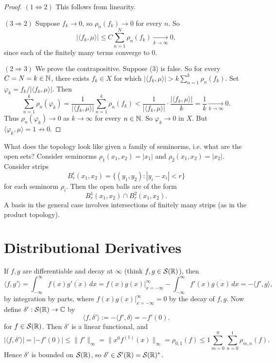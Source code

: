 \begin{proof}
  $(1 \Leftrightarrow 2)$
  This follows from linearity.

  $(3 \Rightarrow 2)$ Suppose
  $f_k \to 0$, so
  $\rho_n(f_k) \to 0$ for every $n$. So
  \[
    |\langle f_k, \mu \rangle|
    \le C \sum_{n = 1}^N \rho_n(f_k)
    \xrightarrow[k \to \infty]{} 0,
  \]
  since
  each of the finitely many terms
  converge to $0$.

  $(2 \Rightarrow 3)$ We prove the
  contrapositive. Suppose (3) is
  false. So for every $C = N = k \in \mathbb{N}$,
  there exists $f_k \in X$ for which
  $|\langle f_k, \mu \rangle| > k \sum_{n = 1}^k \rho_n(f_k)$.
  Set $\varphi_k = f_k / |\langle f_k, \mu \rangle|$.
  Then
  \[
    \sum_{n = 1}^k \rho_n(\varphi_k)
    = \frac{1}{|\langle f_k, \mu \rangle|}
    \sum_{n = 1}^k \rho_n(f_k)
    < \frac{1}{|\langle f_k, \mu \rangle|} \cdot \frac{|\langle f_k, \mu \rangle|}{k}
    = \frac{1}{k}
    \xrightarrow[k \to \infty]{} 0.
  \]
  Thus $\rho_n(\varphi_k) \to 0$ as
  $k \to \infty$ for every $n \in \mathbb{N}$.
  So $\varphi_k \to 0$ in $X$.
  But $\langle \varphi_k, \mu \rangle = 1 \not\to 0$.
\end{proof}

\begin{example}
  What does the topology look like
  given a family of seminorms, i.e.
  what are the open sets?
  Consider seminorms
  $\rho_1(x_1, x_2) = |x_1|$ and
  $\rho_2(x_1, x_2) = |x_2|$. Consider
  strips
  \[
    B^i_r(x_1, x_2)
    = \{(y_1, y_2) :
    |y_i - x_i| < r\}
  \]
  for each seminorm $\rho_i$.
  Then the open balls are of the form
  \[
    B^1_r(x_1, x_2)
    \cap B^2_r(x_1, x_2).
  \]
  A basis in the general case
  involves intersections of
  finitely many strips (as in the
  product topology).
\end{example}

\section{Distributional Derivatives}

\begin{example}
  If $f, g$ are differentiable and
  decay at $\infty$ (think
  $f, g \in \mathcal{S}(\mathbb{R})$), then
  \[
    \langle f, g' \rangle
    = \int_{-\infty}^\infty f(x) \overline{g'(x)} \, dx
    = \left.f(x) g(x)\right|_{x = -\infty}^\infty
    - \int_{-\infty}^\infty f'(x) \overline{g(x)} \, dx
    = -\langle f', g \rangle,
  \]
  by integration by parts, where
  $\left. f(x) g(x)\right|_{x = -\infty}^\infty = 0$ by the
    decay of $f, g$.
  Now define
  $\delta' : \mathcal{S}(\mathbb{R}) \to \mathbb{C}$ by
  \[
    \langle f, \delta' \rangle
    := - \langle f', \delta \rangle
    = - f'(0).
  \]
  for $f \in \mathcal{S}(\mathbb{R})$. Then
  $\delta'$ is a linear functional,
  and
  \[
    |\langle f, \delta' \rangle|
    = |{-f'(0)}|
    \le \|f'\|_\infty
    = \|x^0 f^{(1)}(x)\|_\infty
    = \rho_{0, 1}(f)
    \le 1 \sum_{m = 0}^0 \sum_{n = 0}^1 \rho_{m, n}(f).
  \]
  Hence $\delta'$ is bounded on
  $\mathcal{S}(\mathbb{R})$, so
  $\delta' \in \mathcal{S}'(\mathbb{R}) = \mathcal{S}(\mathbb{R})^*$.
\end{example}

